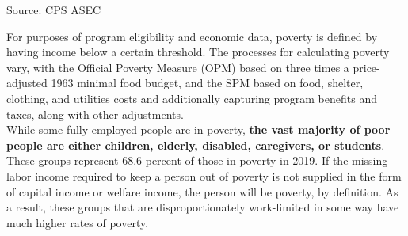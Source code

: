 \documentclass{report}
\newcommand{\barylab}[2]{yticklabel style={text width=#1, align=right, 
		style={black!70}, text height=#2},}
\newcommand{\bbar}[2]{extra #1 ticks = {{#2}}, extra #1 tick labels = ,
		extra #1 tick style = {grid=major, grid style={thick, black!25}},}
\newcommand{\barplotnogrid}{xbar=0pt, axis line style={draw=none},
	    yticklabel style={align=left, anchor=east},
      		xmajorticks=false, ymajorgrids=false,   
	    ytick=data, tickwidth=0pt, area legend, reverse legend,
	    nodes near coords, nodes near coords align={horizontal},}
\begin{document}
{{{\begin{minipage}{0.22\textwidth}
  \hspace*{-4mm} 
  
\footnotesize{Source: CPS ASEC}

\end{minipage}
\vspace{1mm}

\begin{minipage}{0.76\textwidth}
\small For purposes of program eligibility and economic data, poverty is defined by having income below a certain threshold. The processes for calculating poverty vary, with the Official Poverty Measure (OPM) based on three times a price-adjusted 1963 minimal food budget, and the SPM based on food, shelter, clothing, and utilities costs and additionally capturing program benefits and taxes, along with other adjustments.\\

While some fully-employed people are in poverty, \textbf{the vast majority of poor people are either children, elderly, disabled, caregivers, or students}. These groups represent 68.6 percent of those in poverty in 2019. If the missing labor income required to keep a person out of poverty is not supplied in the form of capital income or welfare income, the person will be poverty, by definition. As a result, these groups that are disproportionately work-limited in some way have much higher rates of poverty. 

\end{minipage}

\vspace{3mm}

}}}
\end{document}
